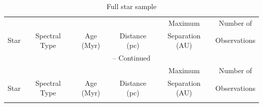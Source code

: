 
\begin{small}
\begin{longtable}{|cccccc|}




    \caption{Full star sample} \\
        \hline
       & & & & Maximum & Number of \\ Star & Spectral Type & Age (Myr) & Distance
       (pc) & Separation (AU) & Observations \\ \hline
        \endfirsthead

        \multicolumn{6}{c}{{\tablename} \thetable{} -- Continued} \\
        \hline
         & & & & Maximum & Number of \\ Star & Spectral Type & Age (Myr) & Distance
       (pc) & Separation (AU) & Observations \\ \hline
        \endhead

        \hline
        \endfoot

        \hline
        \endlastfoot


\end{longtable}
\end{small}
